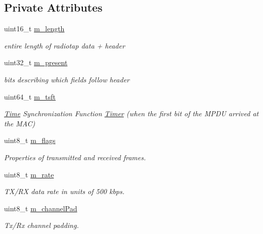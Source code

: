 \subsection*{Private Attributes}
\begin{DoxyCompactItemize}
\item 
uint16\+\_\+t \hyperlink{classns3_1_1RadiotapHeader_a6894ef017e95e58463eac5e435507a33}{m\+\_\+length}
\begin{DoxyCompactList}\small\item\em entire length of radiotap data + header \end{DoxyCompactList}\item 
uint32\+\_\+t \hyperlink{classns3_1_1RadiotapHeader_a8b8aca212245ad4ad1aa796d4cc802bb}{m\+\_\+present}
\begin{DoxyCompactList}\small\item\em bits describing which fields follow header \end{DoxyCompactList}\item 
uint64\+\_\+t \hyperlink{classns3_1_1RadiotapHeader_afbf83bcbbcfeb4c41f1837ef32e301fa}{m\+\_\+tsft}
\begin{DoxyCompactList}\small\item\em \hyperlink{classns3_1_1Time}{Time} Synchronization Function \hyperlink{classns3_1_1Timer}{Timer} (when the first bit of the M\+P\+DU arrived at the M\+AC) \end{DoxyCompactList}\item 
uint8\+\_\+t \hyperlink{classns3_1_1RadiotapHeader_aefad1b59aaf9f374036d10b61c2b34fb}{m\+\_\+flags}
\begin{DoxyCompactList}\small\item\em Properties of transmitted and received frames. \end{DoxyCompactList}\item 
uint8\+\_\+t \hyperlink{classns3_1_1RadiotapHeader_a07b97baa588eecf49cc0da352daa85d3}{m\+\_\+rate}
\begin{DoxyCompactList}\small\item\em T\+X/\+RX data rate in units of 500 kbps. \end{DoxyCompactList}\item 
uint8\+\_\+t \hyperlink{classns3_1_1RadiotapHeader_ae6938e8beb4f5eb3c30574fc3b01775d}{m\+\_\+channel\+Pad}
\begin{DoxyCompactList}\small\item\em Tx/\+Rx channel padding. \end{DoxyCompactList}\item 

\end{DoxyCompactItemize}
